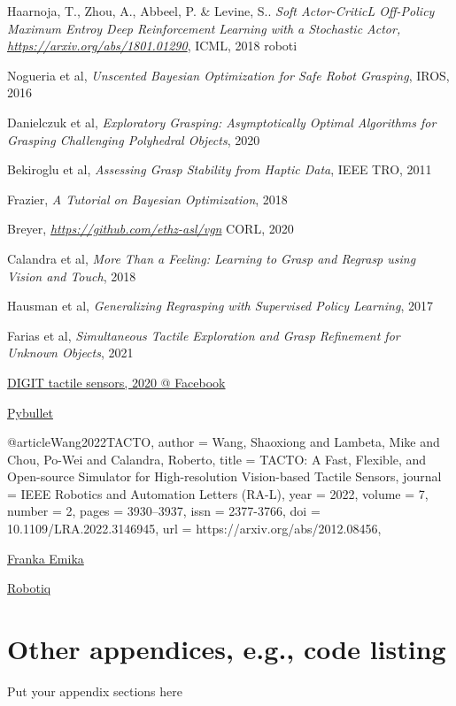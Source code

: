 \documentclass[11pt, a4paper]{report}
\theoremstyle{definition}
\begin{document}
\begin{thebibliography}{9}
    Haarnoja, T., Zhou, A., Abbeel, P. & Levine, S..
    \textit{Soft Actor-CriticL Off-Policy Maximum Entroy Deep Reinforcement Learning with a Stochastic Actor, \href{https://arxiv.org/abs/1801.01290}{https://arxiv.org/abs/1801.01290}},
    ICML,
    2018 roboti

    Nogueria et al,
    \textit{Unscented Bayesian Optimization for Safe Robot Grasping},
    IROS,
    2016

    Danielczuk et al,
    \textit{Exploratory Grasping: Asymptotically Optimal Algorithms for Grasping Challenging Polyhedral Objects},
    2020

    Bekiroglu et al,
    \textit{Assessing Grasp Stability from Haptic Data},
    IEEE TRO,
    2011

    Frazier,
    \textit{A Tutorial on Bayesian Optimization},
    2018

    Breyer,
    \textit{\href{https://github.com/ethz-asl/vgn}{https://github.com/ethz-asl/vgn}}
    CORL,
    2020

    Calandra et al,
    \textit{More Than a Feeling: Learning to Grasp and Regrasp using Vision and Touch},
    2018

    Hausman et al,
    \textit{Generalizing Regrasping with Supervised Policy Learning},
    2017

    Farias et al,
    \textit{Simultaneous Tactile Exploration and Grasp Refinement for Unknown Objects},
    2021

    \href{https://digit.ml/}{DIGIT tactile sensors, 2020 @ Facebook}

    \href{https://pybullet.org/wordpress/}{Pybullet}

@article{Wang2022TACTO,
  author   = {Wang, Shaoxiong and Lambeta, Mike and Chou, Po-Wei and Calandra, Roberto},
  title    = {{TACTO}: A Fast, Flexible, and Open-source Simulator for High-resolution Vision-based Tactile Sensors},
  journal  = {IEEE Robotics and Automation Letters (RA-L)},
  year     = {2022},
  volume   = {7},
  number   = {2},
  pages    = {3930--3937},
  issn     = {2377-3766},
  doi      = {10.1109/LRA.2022.3146945},
  url      = {https://arxiv.org/abs/2012.08456},
}

    \href{https://www.franka.de}{Franka Emika}

    \href{https://robotiq.com/products/2f85-140-adaptive-robot-gripper}{Robotiq}

\end{thebibliography}

\chapter{Other appendices, e.g., code listing}
Put your appendix sections here
\end{document}
